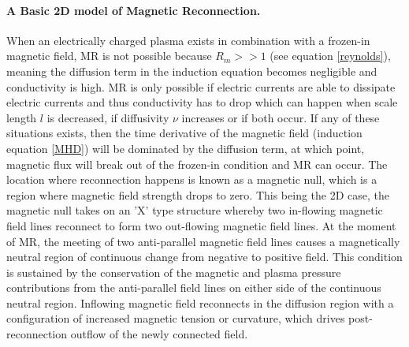 \paragraph{A Basic 2D model of Magnetic Reconnection.}
When an electrically charged plasma exists in combination with a frozen-in magnetic field, MR is not possible because $R_{m} >> 1$ (see equation \ref{reynolds}), meaning the diffusion term in the induction equation becomes negligible and conductivity is high. MR is only possible if electric currents are able to dissipate electric currents and thus conductivity has to drop which can happen when scale length $l$ is decreased, if diffusivity $\nu$ increases or if both occur. If any of these situations exists, then the time derivative of the magnetic field (induction equation \ref{MHD}) will be dominated by the diffusion term, at which point, magnetic flux will break out of the frozen-in condition and MR can occur. The location where reconnection happens is known as a magnetic null, which is a region where magnetic field strength drops to zero. This being the 2D case, the magnetic null takes on an 'X' type structure whereby two in-flowing magnetic field lines reconnect to form two out-flowing magnetic field lines. 
At the moment of MR, the meeting of two anti-parallel magnetic field lines causes a magnetically neutral region of continuous change from negative to positive field. This condition is sustained by the conservation of the magnetic and plasma pressure contributions from the anti-parallel field lines on either side of the continuous neutral region. Inflowing magnetic field reconnects in the diffusion region with a configuration of increased magnetic tension or curvature, which drives post-reconnection outflow of the newly connected field. 






